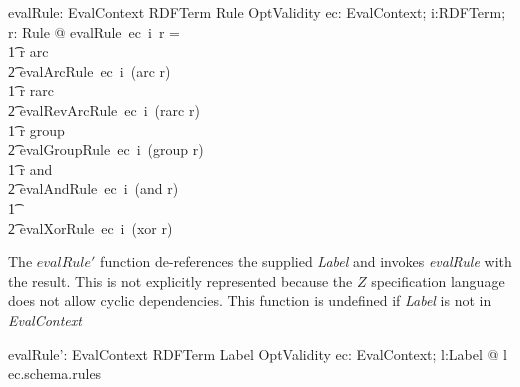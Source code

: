 \documentclass[fuzz]{llncs}
\def\entryFor{\cdot}
\def\zc{\textit}
\begin{document}
\begin{gendef}
   evalRule: EvalContext \fun RDFTerm \fun Rule \fun OptValidity
\where
   \forall ec: EvalContext; i:RDFTerm; r: Rule @ evalRule~ec~i~r = \\
\t1 \IF r \in \ran arc \\
\t2 \THEN evalArcRule~ec~i~(arc \entryFor r) \\
\t1 \ELSE \IF r \in \ran rarc \\
\t2 \THEN evalRevArcRule~ec~i~(rarc \entryFor r) \\
\t1 \ELSE \IF r \in \ran group \\
\t2 \THEN evalGroupRule~ec~i~(group \entryFor r) \\
\t1 \ELSE \IF r \in \ran and \\
\t2 \THEN evalAndRule~ec~i~(and \entryFor r) \\
\t1 \ELSE \\
\t2 evalXorRule~ec~i~(xor \entryFor r)
\end{gendef}
The $evalRule'$ function  de-references the supplied \zc{Label} and
invokes \zc{evalRule} with the result.  This is not explicitly represented because
the $Z$ specification language does not allow cyclic dependencies. This function
is undefined if \zc{Label} is not in \zc{EvalContext}
\begin{gendef}
   evalRule': EvalContext \fun RDFTerm \fun Label \fun OptValidity
\where
   \forall ec: EvalContext; l:Label @ l \in \dom ec.schema.rules
\end{gendef}
\end{document}
